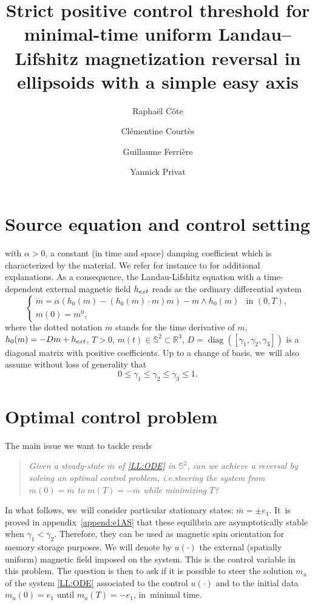 \documentclass[10pt]{amsart}
\newcommand{\ie}{i.e.}
\theoremstyle{definition}
\newcommand{\R} {\mathbb{R}}
\begin{document}
\title{Strict positive control threshold for minimal-time uniform Landau–Lifshitz magnetization reversal in ellipsoids with a simple easy axis}
\author{Raphaël Côte \and Clémentine Courtès \and Guillaume Ferrière \and Yannick Privat}
\maketitle
\section{Source equation and control setting}
with $\alpha>0$, a constant (in time and space) damping coefficient which is characterized by the material. We refer for instance to \cite{hubert2008magnetic,brown1963micromagnetics} for additional explanations.
As a consequence, the Landau-Lifshitz equation with a time-dependent external magnetic field $h_{\rm ext}$ reads as the ordinary differential system
\begin{equation}\label{LL:ODE}
\begin{cases}
\dot{m} = \alpha \left(h_0(m)-(h_0(m)\cdot m) m\right)-m\wedge h_0(m) & \text{in }(0,T), \\
m(0) =m^0,
\end{cases}
\end{equation}
where the dotted notation $\dot{m}$ stands for the time derivative of $m$, $h_0(m)=-Dm+h_{\rm ext}$, $T>0$, $m(t)\in\mathbb{S}^2\subset\R^3$, $D=\operatorname{diag}([\gamma_1,\gamma_2,\gamma_3])$ is a diagonal matrix with positive coefficients.
Up to a change of basis, we~will also assume without loss of generality that
\begin{equation}\label{hyp:alpha}
0\leq \gamma_1\leq \gamma_2\leq\gamma_3\leq 1.
\end{equation}
\section{Optimal control problem}\label{sec:OCP}
\setcounter{theorem}{1}

The main issue we want to tackle reads
\begin{quote}
\textit{Given a steady-state $\overline{m}$ of \eqref{LL:ODE} in $\mathbb{S}^2$, can we achieve a reversal by solving an optimal control problem, \ie steering the system from $m(0)=\overline{m}$ to $m(T)=-\overline{m}$ while minimizing $T$?}
\end{quote}
In what follows, we~will consider particular stationary states: $\overline{m}=\pm e_1$. It~is proved in appendix~\ref{append:e1AS} that these equilibria are asymptotically stable when $\gamma_1 < \gamma_2$. Therefore, they can be used as magnetic spin orientation for memory storage purposes.
We will denote by $u(\cdot)$ the external (spatially uniform) magnetic field imposed on the system. This is the control variable in this problem. The question is then to ask if it is possible to steer the solution $m_u$ of the system \eqref{LL:ODE} associated to the control $u(\cdot)$ and to the initial data $m_u(0)=e_1$ until $m_u(T)=-e_1$, in~minimal time.
\end{document}
